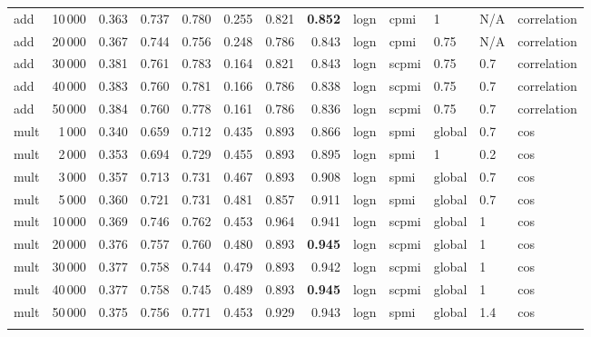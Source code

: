 \begin{tabular}{lrrrrrrrlllll}
     add &           10\,000 &      0.363 &  0.737 &  0.780 &  0.255 &      0.821 &      \textbf{0.852} &  logn &   cpmi &       1 &  N/A &    correlation \\
     add &           20\,000 &      0.367 &  0.744 &  0.756 &  0.248 &      0.786 &      0.843 &  logn &   cpmi &    0.75 &  N/A &    correlation \\
     add &           30\,000 &      0.381 &  0.761 &  0.783 &  0.164 &      0.821 &      0.843 &  logn &  scpmi &    0.75 &  0.7 &    correlation \\
     add &           40\,000 &      0.383 &  0.760 &  0.781 &  0.166 &      0.786 &      0.838 &  logn &  scpmi &    0.75 &  0.7 &    correlation \\
     add &           50\,000 &      0.384 &  0.760 &  0.778 &  0.161 &      0.786 &      0.836 &  logn &  scpmi &    0.75 &  0.7 &    correlation \\ \addlinespace
    mult &            1\,000 &      0.340 &  0.659 &  0.712 &  0.435 &      0.893 &      0.866 &  logn &   spmi &  global &  0.7 &            cos \\
    mult &            2\,000 &      0.353 &  0.694 &  0.729 &  0.455 &      0.893 &      0.895 &  logn &   spmi &       1 &  0.2 &            cos \\
    mult &            3\,000 &      0.357 &  0.713 &  0.731 &  0.467 &      0.893 &      0.908 &  logn &   spmi &  global &  0.7 &            cos \\
    mult &            5\,000 &      0.360 &  0.721 &  0.731 &  0.481 &      0.857 &      0.911 &  logn &   spmi &  global &  0.7 &            cos \\
    mult &           10\,000 &      0.369 &  0.746 &  0.762 &  0.453 &      0.964 &      0.941 &  logn &  scpmi &  global &    1 &            cos \\
    mult &           20\,000 &      0.376 &  0.757 &  0.760 &  0.480 &      0.893 &      \textbf{0.945} &  logn &  scpmi &  global &    1 &            cos \\
    mult &           30\,000 &      0.377 &  0.758 &  0.744 &  0.479 &      0.893 &      0.942 &  logn &  scpmi &  global &    1 &            cos \\
    mult &           40\,000 &      0.377 &  0.758 &  0.745 &  0.489 &      0.893 &      \textbf{0.945} &  logn &  scpmi &  global &    1 &            cos \\
    mult &           50\,000 &      0.375 &  0.756 &  0.771 &  0.453 &      0.929 &      0.943 &  logn &   spmi &  global &  1.4 &            cos \\ \addlinespace

\end{tabular}
